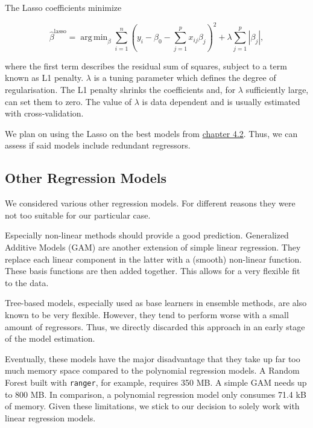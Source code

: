 \documentclass[12pt,a4paper]{article}
\DeclareMathOperator*{\argmin}{arg\,min}
\begin{document}
The \ac{Lasso} coefficients minimize

\begin{equation}
    \hat{\beta}^{\text{lasso}} = \argmin_{\beta} \sum^n_{i=1} \left( y_i - \beta_0 - \sum^p_{j=1} x_{ij} \beta_j \right)^2 + 
    \lambda \sum^p_{j=1} |\beta_j |,
\label{eq:9}
\end{equation}

where the first term describes the residual sum of squares, subject to a
term known as L1 penalty. \(\lambda\) is a tuning parameter which
defines the degree of regularisation. The L1 penalty shrinks the
coefficients and, for \(\lambda\) sufficiently large, can set them to
zero. The value of \(\lambda\) is data dependent and is usually
estimated with cross-validation. \autocite{James_2013}

We plan on using the \ac{Lasso} on the best models from
\protect\hyperlink{polynomial-regression}{chapter 4.2}. Thus, we can
assess if said models include redundant regressors.

\hypertarget{other-regression-models}{%
\subsection{Other Regression Models}\label{other-regression-models}}

We considered various other regression models. For different reasons
they were not too suitable for our particular case.

Especially non-linear methods should provide a good prediction.
Generalized Additive Models (GAM) are another extension of simple linear
regression. They replace each linear component in the latter with a
(smooth) non-linear function. These basis functions are then added
together. This allows for a very flexible fit to the data.
\autocite{James_2013}

Tree-based models, especially used as base learners in ensemble methods,
are also known to be very flexible. However, they tend to perform worse
with a small amount of regressors. Thus, we directly discarded this
approach in an early stage of the model estimation.

Eventually, these models have the major disadvantage that they take up
far too much memory space compared to the polynomial regression models.
A Random Forest built with \texttt{ranger}, for example, requires 350
MB. A simple GAM needs up to 800 MB. In comparison, a polynomial
regression model only consumes 71.4 kB of memory. Given these
limitations, we stick to our decision to solely work with linear
regression models.
\end{document}
